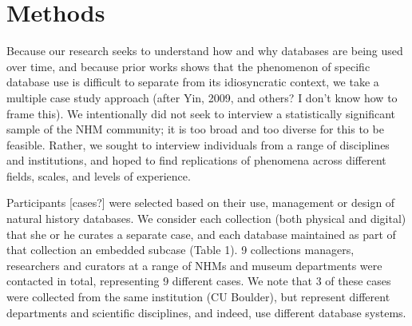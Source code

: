 \section{Methods}

Because our research seeks to understand how and why databases are being used over time, and because prior works shows that the phenomenon of specific database use is difficult to separate from its idiosyncratic context, we take a multiple case study approach (after Yin, 2009, and others? I don’t know how to frame this).   We intentionally did not seek to interview a statistically significant sample of the NHM community; it is too broad and too diverse for this to be feasible.  Rather, we sought to interview individuals from a range of disciplines and institutions, and hoped to find replications of phenomena across different fields, scales, and levels of experience.

Participants [cases?] were selected based on their use, management or design of natural history databases. We consider each collection (both physical and digital) that she or he curates a separate case, and each database maintained as part of that collection an embedded subcase (Table 1).   9 collections managers, researchers and curators at a range of NHMs and museum departments were contacted in total, representing 9 different cases.   We note that 3 of these cases were collected from the same institution (CU Boulder), but represent different departments and scientific disciplines, and indeed, use different database systems.